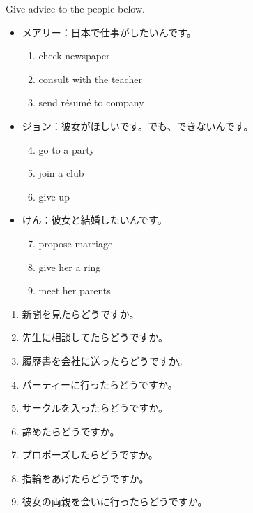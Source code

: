 \documentclass[notoc,notitlepage]{tufte-book}
\begin{document}
\begin{ex}
  Give advice to the people below.
  \begin{itemize}
    \item メアリー：日本で仕事がしたいんです。
      \begin{enumerate}
        \item check newspaper
        \item consult with the teacher
        \item send r\'esum\'e to company
      \end{enumerate}
    \item ジョン：彼女がほしいです。でも、できないんです。
      \begin{enumerate}
        \setcounter{enumi}{3}
        \item go to a party
        \item join a club
        \item give up
      \end{enumerate}
    \item けん：彼女と結婚したいんです。
      \begin{enumerate}
        \setcounter{enumi}{6}
        \item propose marriage
        \item give her a ring
        \item meet her parents
      \end{enumerate}
  \end{itemize}
  
  \begin{solution}
    \begin{enumerate}
      \item 新聞を見たらどうですか。
      \item 先生に相談してたらどうですか。
      \item 履歴書を会社に送ったらどうですか。
      \item パーティーに行ったらどうですか。
      \item サークルを入ったらどうですか。
      \item 諦めたらどうですか。
      \item プロポーズしたらどうですか。
      \item 指輪をあげたらどうですか。
      \item 彼女の両親を会いに行ったらどうですか。
    \end{enumerate}
  \end{solution}
\end{ex}
\end{document}
